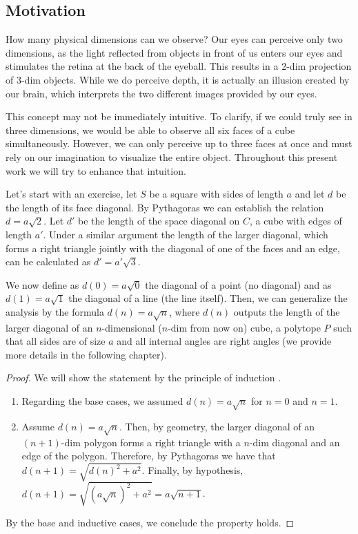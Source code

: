 \documentclass{article}
\begin{document}
	\subsection{Motivation}
	How many physical dimensions can we observe? Our eyes can perceive only two dimensions, as the light reflected from objects in front of us enters our eyes and stimulates the retina at the back of the eyeball. This results in a $2$-dim projection of $3$-dim objects. While we do perceive depth, it is actually an illusion created by our brain, which interprets the two different images provided by our eyes.
	
	This concept may not be immediately intuitive. To clarify, if we could truly see in three dimensions, we would be able to observe all six faces of a cube simultaneously. However, we can only perceive up to three faces at once and must rely on our imagination to visualize the entire object. Throughout this present work we will try to enhance that intuition.
	
	Let's start with an exercise, let $S$ be a square \cite{euclid} with sides of length $a$ and let $d$ be the length of its face diagonal. By Pythagoras \cite{euclid} we can establish the relation $d=a\sqrt{2}$. Let $d'$ be the length of the space diagonal on $C$, a cube \cite{euclid} with edges of length $a'$. Under a similar argument the length of the larger diagonal, which forms a right triangle jointly with the diagonal of one of the faces and an edge, can be calculated as $d'=a'\sqrt{3}$.
	
	We now define as $d(0) = a\sqrt{0}$ the diagonal of a point (no diagonal) and as $d(1) = a\sqrt{1}$ the diagonal of a line (the line itself). Then, we can generalize the analysis by the formula $d(n) = a\sqrt{n}$, where $d(n)$ outputs the length of the larger diagonal of an $n$-dimensional ($n$-dim from now on) cube, a polytope $P$ such that all sides are of size $a$ and all internal angles are right angles \cite{coxeter1973regular} (we provide more details in the following chapter).
	
	\begin{proof}
		We will show the statement by the principle of induction \cite{rosen2011discrete}.
		\begin{enumerate}
			\item Regarding the base cases, we assumed $d(n)=a\sqrt{n}$ for $n=0$ and $n=1$.
			
			\item Assume $d(n)=a\sqrt{n}$. Then, by geometry, the larger diagonal of an $(n+1)$-dim polygon forms a right triangle with a $n$-dim diagonal and an edge of the polygon. Therefore, by Pythagoras we have that $d(n+1) = \sqrt{d(n)^2 + a^2}$. Finally, by hypothesis, $d(n+1) = \sqrt{(a\sqrt{n})^2 + a^2} = a \sqrt{n + 1}$.
		\end{enumerate}
		By the base and inductive cases, we conclude the property holds.
	\end{proof}
	
\end{document}
